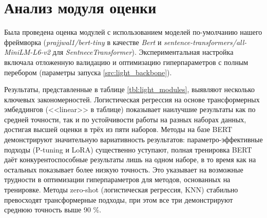 \documentclass[14pt,a4paper,oneside,openany]{extbook}
\begin{document}
\section{Анализ модуля оценки}
\label{sec:org1eeb21c}
Была проведена оценка модулей с использованием моделей по-умолчанию нашего фреймворка (\emph{prajjwal1/bert-tiny}\autocite{bhargava_generalization_2021} в качестве \emph{Bert} и \emph{sentence-transformers/all-MiniLM-L6-v2} для \emph{SentneceTransformer}). Экспериментальная настройка включала отложенную валидацию и оптимизацию гиперпараметров с полным перебором (параметры запуска \ref{src:light_backbone}).

Результаты, представленные в таблице \ref{tbl:light_modules}, выявляют несколько ключевых закономерностей. Логистическая регрессия на основе трансформерных эмбеддингов ({}<<linear>>{} в таблице) показывает наилучшие результаты как по средней точности, так и по устойчивости работы на разных наборах данных, достигая высшей оценки в трёх из пяти наборов. Методы на базе BERT демонстрируют значительную вариативность результатов: параметро-эффективные подходы (P-tuning и LoRA) существенно уступают, полная тренировка BERT даёт конкурентоспособные результаты лишь на одном наборе, в то время как на остальных показывает более низкую точность. Это указывает на возможные трудности в оптимизации гиперпараметров для методов, основанных на тренировке. Методы zero-shot (логистическая регрессия, KNN) стабильно превосходят трансформерные подходы, при этом все три демонстрируют среднюю точность выше 90 \%.
\end{document}
